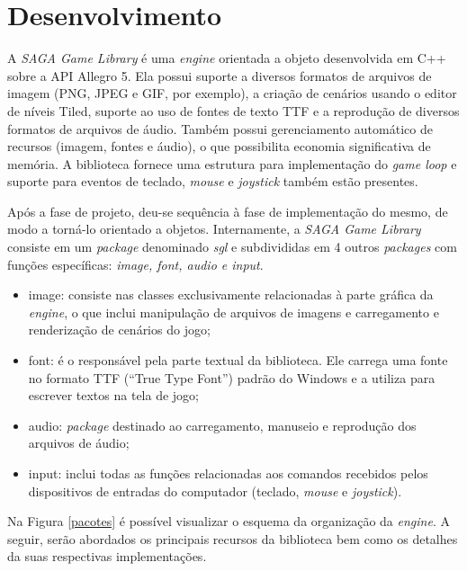 \chapter{Desenvolvimento}
\label{cap:desenvolvimento}
%
%
%
A \textit{SAGA Game Library} é uma \textit{engine} orientada a objeto desenvolvida em C++ sobre a API Allegro 5. Ela possui suporte a diversos formatos de arquivos de imagem (PNG, JPEG e GIF, por exemplo), a criação de cenários usando o editor de níveis Tiled, suporte ao uso de fontes de texto TTF e a reprodução de diversos formatos de arquivos de áudio. Também possui gerenciamento automático de recursos (imagem, fontes e áudio), o que possibilita economia significativa de memória. A biblioteca fornece uma estrutura para implementação do \textit{game loop} e suporte para eventos de teclado, \textit{mouse} e \textit{joystick} também estão presentes. 
\par 
Após a fase de projeto, deu-se sequência à fase de implementação do mesmo, de modo a torná-lo orientado a objetos. Internamente, a \textit{SAGA Game Library} consiste em um \textit{package} denominado \textit{sgl} e subdivididas em 4 outros \textit{packages} com funções específicas: \textit{image, font, audio e input}.
%
%
\begin{itemize}
 \item image: consiste nas classes exclusivamente relacionadas à parte gráfica da \textit{engine}, o que inclui manipulação de arquivos de imagens e carregamento e renderização de cenários do jogo;
 \item font: é o responsável pela parte textual da biblioteca. Ele carrega uma fonte no formato TTF (``True Type Font'') padrão do Windows e a utiliza para escrever textos na tela de jogo;
 \item audio: \textit{package} destinado ao carregamento, manuseio e reprodução dos arquivos de áudio;
 \item input: inclui todas as funções relacionadas aos comandos recebidos pelos dispositivos de entradas do computador (teclado, \textit{mouse} e \textit{joystick}).
\end{itemize}
%
Na Figura \ref{pacotes} é possível visualizar o esquema da organização da \textit{engine}. A seguir, serão abordados os principais recursos da biblioteca bem como os detalhes da suas respectivas implementações.
%
%
%
%
